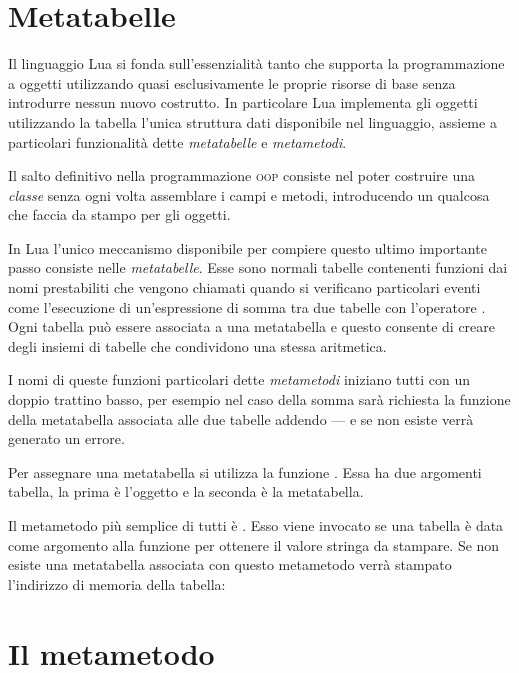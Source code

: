 \section{Metatabelle}

Il linguaggio Lua si fonda sull'essenzialità tanto che supporta la
programmazione a oggetti utilizzando quasi esclusivamente le proprie risorse di
base senza introdurre nessun nuovo costrutto. In particolare Lua implementa gli
oggetti utilizzando la tabella l'unica struttura dati disponibile nel
linguaggio, assieme a particolari funzionalità dette \emph{metatabelle} e
\emph{metametodi}.

Il salto definitivo nella programmazione \textsc{oop} consiste nel poter
costruire una \emph{classe} senza ogni volta assemblare i campi e metodi,
introducendo un qualcosa che faccia da stampo per gli oggetti.

In Lua l'unico meccanismo disponibile per compiere questo ultimo importante
passo consiste nelle \emph{metatabelle}. Esse sono normali tabelle contenenti
funzioni dai nomi prestabiliti che vengono chiamati quando si verificano
particolari eventi come l'esecuzione di un'espressione di somma tra due tabelle
con l'operatore \key{+}. Ogni tabella può essere associata a una metatabella e
questo consente di creare degli insiemi di tabelle che condividono una stessa
aritmetica.

I nomi di queste funzioni particolari dette \emph{metametodi} iniziano tutti
con un doppio trattino basso, per esempio nel caso della somma sarà richiesta
la funzione  della metatabella associata alle due tabelle addendo
--- e se non esiste verrà generato un errore.

Per assegnare una metatabella si utilizza la funzione . Essa
ha due argomenti tabella, la prima è l'oggetto e la seconda è la metatabella.

Il metametodo più semplice di tutti è . Esso viene
invocato se una tabella è data come argomento alla funzione  per
ottenere il valore stringa da stampare. Se non esiste una metatabella
associata con questo metametodo verrà stampato l'indirizzo di memoria della
tabella:


\section{Il metametodo }
\label{secFondMetaIndex}

